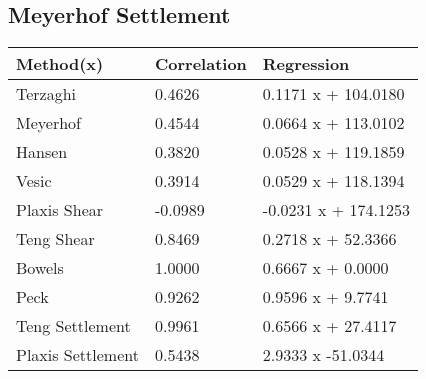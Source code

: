 \subsection{Meyerhof Settlement}
\begin{tabularx}{\textwidth}{ | p{} | X | X | }
\hline
\textbf{Method(x)} & \textbf{Correlation} & \textbf{Regression} \\
\hline
 Terzaghi & 0.4626 & 0.1171 x + 104.0180\\
 Meyerhof & 0.4544 & 0.0664 x + 113.0102\\
 Hansen & 0.3820 & 0.0528 x + 119.1859\\
 Vesic & 0.3914 & 0.0529 x + 118.1394\\
 Plaxis Shear & -0.0989 & -0.0231 x + 174.1253\\
 Teng Shear & 0.8469 & 0.2718 x + 52.3366\\
 Bowels & 1.0000 & 0.6667 x + 0.0000\\
 Peck & 0.9262 & 0.9596 x + 9.7741\\
 Teng Settlement & 0.9961 & 0.6566 x + 27.4117\\
 Plaxis Settlement & 0.5438 & 2.9333 x  -51.0344\\
\hline
\end{tabularx}
